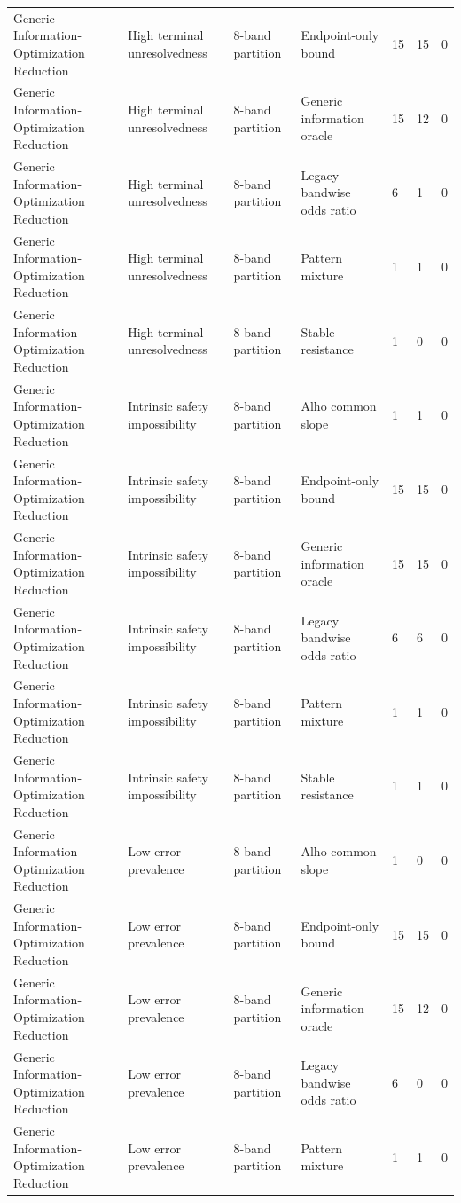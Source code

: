 \begin{tabular}{lllllll}
Generic Information-Optimization Reduction & High terminal unresolvedness & 8-band partition & Endpoint-only bound & 15 & 15 & 0 \\
Generic Information-Optimization Reduction & High terminal unresolvedness & 8-band partition & Generic information oracle & 15 & 12 & 0 \\
Generic Information-Optimization Reduction & High terminal unresolvedness & 8-band partition & Legacy bandwise odds ratio & 6 & 1 & 0 \\
Generic Information-Optimization Reduction & High terminal unresolvedness & 8-band partition & Pattern mixture & 1 & 1 & 0 \\
Generic Information-Optimization Reduction & High terminal unresolvedness & 8-band partition & Stable resistance & 1 & 0 & 0 \\
Generic Information-Optimization Reduction & Intrinsic safety impossibility & 8-band partition & Alho common slope & 1 & 1 & 0 \\
Generic Information-Optimization Reduction & Intrinsic safety impossibility & 8-band partition & Endpoint-only bound & 15 & 15 & 0 \\
Generic Information-Optimization Reduction & Intrinsic safety impossibility & 8-band partition & Generic information oracle & 15 & 15 & 0 \\
Generic Information-Optimization Reduction & Intrinsic safety impossibility & 8-band partition & Legacy bandwise odds ratio & 6 & 6 & 0 \\
Generic Information-Optimization Reduction & Intrinsic safety impossibility & 8-band partition & Pattern mixture & 1 & 1 & 0 \\
Generic Information-Optimization Reduction & Intrinsic safety impossibility & 8-band partition & Stable resistance & 1 & 1 & 0 \\
Generic Information-Optimization Reduction & Low error prevalence & 8-band partition & Alho common slope & 1 & 0 & 0 \\
Generic Information-Optimization Reduction & Low error prevalence & 8-band partition & Endpoint-only bound & 15 & 15 & 0 \\
Generic Information-Optimization Reduction & Low error prevalence & 8-band partition & Generic information oracle & 15 & 12 & 0 \\
Generic Information-Optimization Reduction & Low error prevalence & 8-band partition & Legacy bandwise odds ratio & 6 & 0 & 0 \\
Generic Information-Optimization Reduction & Low error prevalence & 8-band partition & Pattern mixture & 1 & 1 & 0 \\

\end{tabular}

